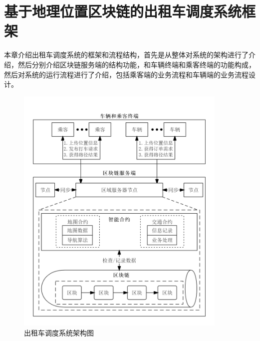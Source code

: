 \chapter{基于地理位置区块链的出租车调度系统框架}

本章介绍出租车调度系统的框架和流程结构，首先是从整体对系统的架构进行了介绍，然后分别介绍区块链服务端的结构功能，和车辆终端和乘客终端的功能构成，然后对系统的运行流程进行了介绍，包括乘客端的业务流程和车辆端的业务流程设计。

\begin{figure}[h]
  \centering
  \includegraphics[width=0.9\textwidth]{figures/structure}
  \caption{出租车调度系统架构图}\label{fig:structure}
\end{figure}

